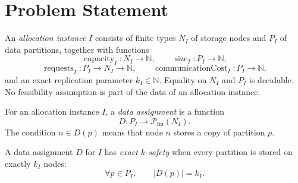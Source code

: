 
\setcounter{section}{2}
\section{Problem Statement}

\begin{definition}\label{def:allocation-instance}
An \emph{allocation instance} $I$ consists of finite types $N_I$ of storage
nodes and $P_I$ of data partitions, together with functions
\[
  \operatorname{capacity}_I : N_I \to \mathbb{N}, \qquad
  \operatorname{size}_I : P_I \to \mathbb{N},
\]
\[
  \operatorname{requests}_I : P_I \to N_I \to \mathbb{N}, \qquad
  \operatorname{communicationCost}_I : P_I \to \mathbb{N},
\]
and an exact replication parameter $k_I\in\mathbb{N}$. Equality on $N_I$ and
$P_I$ is decidable. No feasibility assumption is part of the data of an
allocation instance.
\end{definition}

\begin{definition}\label{def:data-assignment}
For an allocation instance $I$, a \emph{data assignment} is a function
\[
  D : P_I \longrightarrow \mathcal{P}_{\mathrm{fin}}(N_I).
\]
The condition $n\in D(p)$ means that node $n$ stores a copy of partition $p$.
\end{definition}

\begin{definition}\label{def:exact-k-safety}
A data assignment $D$ for $I$ has \emph{exact $k$-safety} when every partition
is stored on exactly $k_I$ nodes:
\[
  \forall p\in P_I, \qquad |D(p)|=k_I.
\]
\end{definition}

